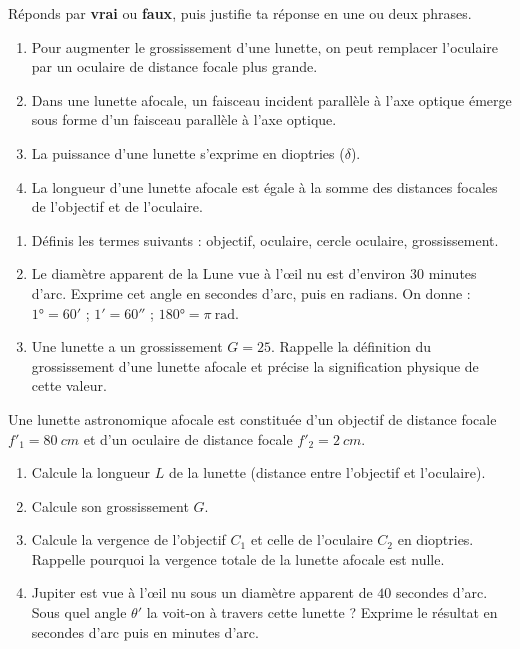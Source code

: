 \documentclass[11pt]{article}
\newcommand{\cle}[1]{{\popxbold\color{popdark}#1}}
\begin{document}
\begin{exercice}
Réponds par \textbf{vrai} ou \textbf{faux}, puis justifie ta réponse en une ou deux phrases.
\begin{enumerate}
\item Pour augmenter le grossissement d'une lunette, on peut remplacer l'oculaire par un oculaire de distance focale plus grande.
\item Dans une lunette afocale, un faisceau incident parallèle à l'axe optique émerge sous forme d'un faisceau parallèle à l'axe optique.
\item La puissance d'une lunette s'exprime en dioptries ($\delta$).
\item La longueur d'une lunette afocale est égale à la somme des distances focales de l'objectif et de l'oculaire.
\end{enumerate}
\end{exercice}

\begin{exercice}
\begin{enumerate}
\item Définis les termes suivants : \cle{objectif}, \cle{oculaire}, \cle{cercle oculaire}, \cle{grossissement}.
\item Le diamètre apparent de la Lune vue à l'œil nu est d'environ $30$ minutes d'arc. Exprime cet angle en secondes d'arc, puis en radians. On donne : $1° = 60'$ ; $1' = 60''$ ; $180° = \pi\ \text{rad}$.
\item Une lunette a un grossissement $G = 25$. Rappelle la définition du grossissement d'une lunette afocale et précise la signification physique de cette valeur.
\end{enumerate}
\end{exercice}

\begin{exercice}
Une lunette astronomique afocale est constituée d'un objectif de distance focale $f'_1 = \SI{80}{cm}$ et d'un oculaire de distance focale $f'_2 = \SI{2}{cm}$.
\begin{enumerate}
\item Calcule la longueur $L$ de la lunette (distance entre l'objectif et l'oculaire).
\item Calcule son grossissement $G$.
\item Calcule la vergence de l'objectif $C_1$ et celle de l'oculaire $C_2$ en dioptries. Rappelle pourquoi la vergence totale de la lunette afocale est nulle.
\item Jupiter est vue à l'œil nu sous un diamètre apparent de $40$ secondes d'arc. Sous quel angle $\theta'$ la voit-on à travers cette lunette ? Exprime le résultat en secondes d'arc puis en minutes d'arc.
\end{enumerate}
\end{exercice}
\end{document}
